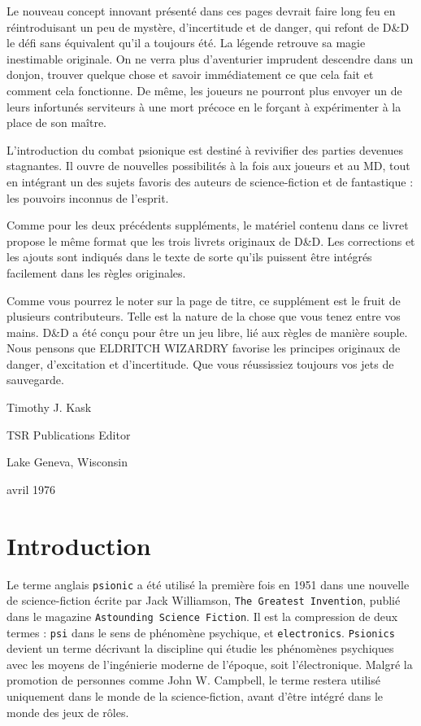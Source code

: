 \documentclass[11pt]{article}
\begin{document}
Le nouveau concept innovant présenté dans ces pages devrait faire long feu en réintroduisant un peu de mystère, d'incertitude et de danger, qui refont de D\&D le défi sans équivalent qu'il a toujours été. La légende retrouve sa magie inestimable originale. On ne verra plus d'aventurier imprudent descendre dans un donjon, trouver quelque chose et savoir immédiatement ce que cela fait et comment cela fonctionne. De même, les joueurs ne pourront plus envoyer un de leurs infortunés serviteurs à une mort précoce en le forçant à expérimenter à la place de son maître.

L'introduction du combat psionique est destiné à revivifier des parties devenues stagnantes. Il ouvre de nouvelles possibilités à la fois aux joueurs et au MD, tout en intégrant un des sujets favoris des auteurs de science-fiction et de fantastique : les pouvoirs inconnus de l'esprit.

Comme pour les deux précédents suppléments, le matériel contenu dans ce livret propose le même format que les trois livrets originaux de D\&D. Les corrections et les ajouts sont indiqués dans le texte de sorte qu'ils puissent être intégrés facilement dans les règles originales.

Comme vous pourrez le noter sur la page de titre, ce supplément est le fruit de plusieurs contributeurs. Telle est la nature de la chose que vous tenez entre vos mains. D\&D a été conçu pour être un jeu libre, lié aux règles de manière souple. Nous pensons que ELDRITCH WIZARDRY favorise les principes originaux de danger, d'excitation et d'incertitude. Que vous réussissiez toujours vos jets de sauvegarde.

\vspace{1cm}

\noindent Timothy J. Kask

\noindent TSR Publications Editor

\noindent Lake Geneva, Wisconsin

 avril 1976

\newpage
\phantom{-}
\newpage

\section*{Introduction}

Le terme anglais \texttt{psionic} a été utilisé la première fois en 1951 dans une nouvelle de science-fiction écrite par Jack Williamson, \texttt{The Greatest Invention}, publié dans le magazine \texttt{Astounding Science Fiction}. Il est la compression de deux termes : \texttt{psi} dans le sens de phénomène psychique, et \texttt{electronics}. \texttt{Psionics} devient un terme décrivant la discipline qui étudie les phénomènes psychiques avec les moyens de l'ingénierie moderne de l'époque, soit l'électronique. Malgré la promotion de personnes comme John W. Campbell, le terme restera utilisé uniquement dans le monde de la science-fiction, avant d'être intégré dans le monde des jeux de rôles.
\end{document}
